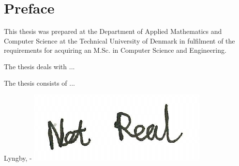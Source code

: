 \chapter{Preface}

This thesis was prepared at the Department of Applied Mathematics and Computer Science at the Technical University of Denmark in fulfilment of the
requirements for acquiring an M.Sc. in Computer Science and Engineering.

The thesis deals with ...

The thesis consists of ...
\vspace{20mm}
\begin{center}
    \hspace{20mm} Lyngby, \thesishandin-\thesisyear
    \vspace{5mm}
    \newline
    \includegraphics[scale=0.5]{figures/SignatureDummy.jpg}
\end{center}
\begin{flushright}
    \thesisauthor
\end{flushright}
